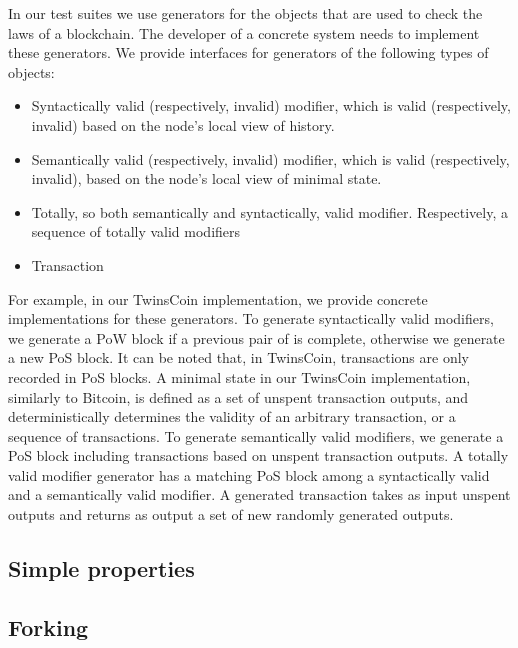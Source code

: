 In our test suites we use generators for the objects that are used to check the laws of a blockchain. The developer of a concrete system needs to implement these generators. We provide interfaces for generators of the following types of objects:

\begin{itemize}
	\item{Syntactically valid (respectively, invalid) modifier, which is valid (respectively, invalid) based on the node's local view of history.}
	\item{Semantically valid (respectively, invalid) modifier, which is valid (respectively, invalid), based on the node's local view of minimal state.}
	\item{Totally, so both semantically and syntactically, valid modifier. Respectively, a sequence of totally valid modifiers}
	\item{Transaction}
\end{itemize}

For example, in our TwinsCoin implementation, we provide concrete implementations for these generators. To generate syntactically valid modifiers, we generate a PoW block if a previous pair of {\em<PoW block, PoS block>} is complete, otherwise we generate a new PoS block. It can be noted that, in TwinsCoin, transactions are only recorded in PoS blocks. A minimal state in our TwinsCoin implementation, similarly to Bitcoin, is defined as a set of unspent transaction outputs, and deterministically determines the validity of an arbitrary transaction, or a sequence of transactions. To generate semantically valid modifiers, we generate a PoS block including transactions based on unspent transaction outputs. A totally valid modifier generator has a matching PoS block among a syntactically valid and a semantically valid modifier. A generated transaction takes as input unspent outputs and returns as output a set of new randomly generated outputs.

\subsection{Simple properties}

\subsection{Forking}


